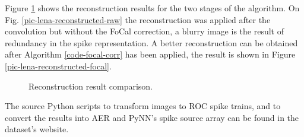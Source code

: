 Figure \ref{fig-reconstruction-results} shows the reconstruction results for the two stages of the algorithm. On Fig. \ref{pic-lena-reconstructed-raw} the reconstruction was applied after the convolution but without the FoCal correction, a blurry image is the result of redundancy in the spike representation. A better reconstruction can be obtained after Algorithm \ref{code-focal-corr} has been applied, the result is shown in Figure \ref{pic-lena-reconstructed-focal}.


\begin{figure}[hbt]
  \centering
  \caption{Reconstruction result comparison.}
  \label{fig-reconstruction-results}
\end{figure}

The source Python scripts to transform images to ROC spike trains, and to convert the results into AER and PyNN's spike source array can be found in the dataset's website.